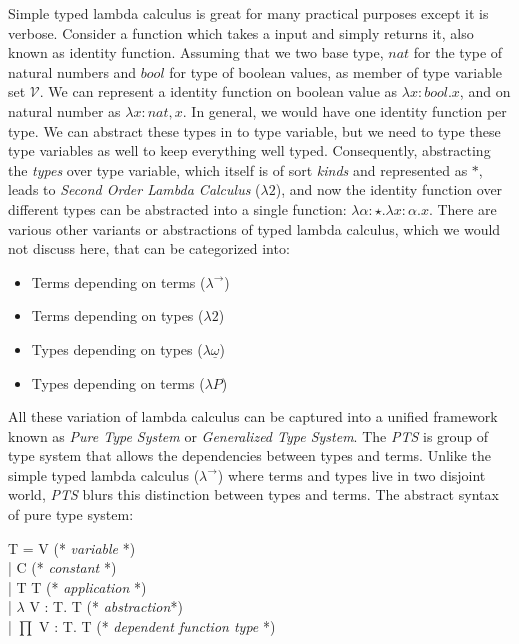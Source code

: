 Simple typed lambda calculus is great for many practical purposes except it is verbose. Consider a function 
which takes a input and simply returns it, also known as identity function. Assuming that we two 
base type, $nat$ for the type of natural numbers and $bool$ for type of boolean values, as member of 
type variable set $\mathcal{V}$. We can represent a
 identity function on boolean value as $\lambda x : bool. x$, and on natural number as 
 $\lambda x : nat, x$. In general, we would have one identity function per type. We can 
 abstract these types in to type variable, but we need to type these type variables as well
 to keep everything well typed.  Consequently, abstracting the 
 \textit{types} over type variable, which itself is of sort \textit{kinds} and represented as $*$, 
 leads to \textit{Second Order Lambda Calculus} ($\lambda2$), and 
 now the identity function over different types can be abstracted into a single function:
 $\lambda \alpha : \star. \lambda x : \alpha. x$.
 There are various other variants or abstractions 
 of typed lambda calculus, which we would not discuss here, that can be categorized into:
 \begin{itemize}
 \item Terms depending on terms ($\lambda^{\to}$)
 \item Terms depending on types  ($\lambda2$)
 \item Types depending on types  ($\lambda {\underline{\omega}}$)
 \item Types depending on terms  ($\lambda P$)
 \end{itemize}



All these variation of lambda calculus can be captured into a unified framework
known as \textit{Pure Type System} or \textit{Generalized Type System}.
The \textit{PTS} is group of type system that allows the dependencies between 
types and terms. Unlike the simple typed lambda calculus ($\lambda^{\to}$) where 
terms and types live in two disjoint world, \textit{PTS} blurs this distinction between 
types and terms.  The abstract syntax  of pure type system:
 \begin{displayquote}

    T = V   (* \textit{variable} *)\\
       |  C   (* \textit{constant} *)\\
       | T T (* \textit{application} *)\\
       | $\lambda$ V : T. T (* \textit{abstraction}*) \\
       | $\prod$ V : T. T  (* \textit{dependent function type} *)
   \end{displayquote}

